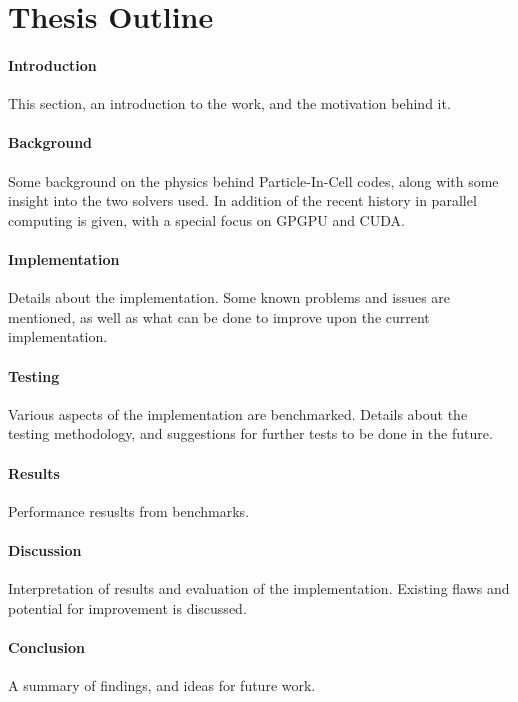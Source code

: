 \section{Thesis Outline}
\paragraph{Introduction}
This section, an introduction to the work, and the motivation behind it.
\paragraph{Background}
Some background on the physics behind Particle-In-Cell codes, along with some insight into the two solvers used. In
addition of the recent history in parallel computing is given, with a special focus on GPGPU and CUDA.
\paragraph{Implementation}
Details about the implementation. Some known problems and issues are mentioned, as well as what can be done to improve
upon the current implementation.
\paragraph{Testing}
Various aspects of the implementation are benchmarked. Details about the testing methodology, and suggestions for further
tests to be done in the future.
\paragraph{Results}
Performance resuslts from benchmarks.
\paragraph{Discussion}
Interpretation of results and evaluation of the implementation. Existing flaws and potential for improvement is discussed.
\paragraph{Conclusion}
A summary of findings, and ideas for future work.